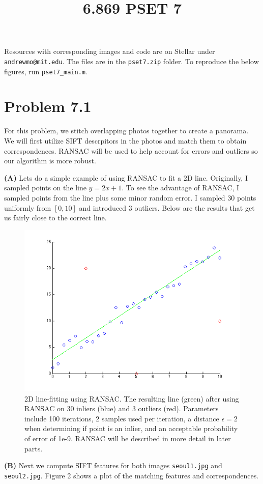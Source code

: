 \documentclass[12pt,twoside]{article}
\title{6.869 PSET 7}
\newcommand{\theproblemsetnum}{7}
\newcommand{\tabUnit}{3ex}
\newcommand{\tabT}{\hspace*{\tabUnit}}
\begin{document}
\handout{Problem Set \theproblemsetnum}{Nov 6, 2014 (1:00pm)}
\tabT Resources with corresponding images and code are on Stellar under \texttt{andrewmo@mit.edu}.  The files are in the \texttt{pset7.zip} folder.  To reproduce the below figures, run \texttt{pset7\_main.m}.


\section*{Problem 7.1}
\tabT For this problem, we stitch overlapping photos together to create a panorama.  We will first utilize SIFT descrpitors in the photos and match them to obtain correspondences.  RANSAC will be used to help account for errors and outliers so our algorithm is more robust.
\newline

\textbf{(A)} Lets do a simple example of using RANSAC to fit a 2D line.  Originally, I sampled points on the line $y=2x + 1$.  To see the advantage of RANSAC, I sampled points from the line plus some minor random error.  I sampled $30$ points uniformly from $[0,10]$ and introduced $3$ outliers.  Below are the results that get us fairly close to the correct line.

\begin{figure}[h]
  \begin{center}
    \includegraphics[width=0.5\linewidth]{ransac2d.png}

  \end{center}
  \caption{2D line-fitting using RANSAC.  The resulting line (green) after using RANSAC on 30 inliers (blue) and 3 outliers (red).  Parameters include 100 iterations, 2 samples used per iteration, a distance $\epsilon = 2$ when determining if point is an inlier, and an acceptable probability of error of 1e-9. RANSAC will be described in more detail in later parts.}
  \label{fig:pipeline}
\end{figure}

\textbf{(B)} Next we compute SIFT features for both images \texttt{seoul1.jpg} and \texttt{seoul2.jpg}.  Figure 2 shows a plot of the matching features and correspondences.\newline
\end{document}
